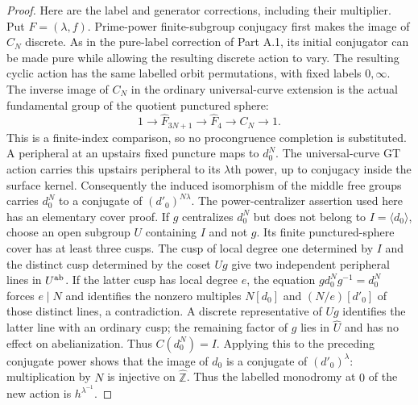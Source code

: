 \begin{proof}
Here are the label and generator corrections, including their
multiplier.  Put $F=(\lambda,f)$.  Prime-power finite-subgroup
conjugacy first makes the image of $C_N$ discrete.  As in the
pure-label correction of Part A.1, its initial conjugator can be
made pure while allowing the resulting discrete action to vary.
The resulting cyclic action has the same labelled orbit
permutations, with fixed labels $0,\infty$.  The inverse image of
$C_N$ in the ordinary universal-curve extension is the actual
fundamental group of the quotient punctured sphere:
\[
 1\longrightarrow\widehat F_{3N+1}
  \longrightarrow\widehat F_4\longrightarrow C_N\longrightarrow1.
                                                               \tag{B.K3}
\]
This is a finite-index comparison, so no procongruence completion
is substituted.  A peripheral at an upstairs fixed puncture maps
to $d_0^N$.  The universal-curve GT action carries this upstairs
peripheral to its $\lambda$th power, up to conjugacy inside the
surface kernel.  Consequently the induced isomorphism of the
middle free groups carries $d_0^N$ to a conjugate of
$(d'_0)^{N\lambda}$.  The power-centralizer assertion used here has an elementary
cover proof.  If $g$ centralizes $d_0^N$ but does not belong to
$I=\langle d_0\rangle$, choose an open subgroup $U$ containing
$I$ and not $g$.  Its finite punctured-sphere cover has at least
three cusps.  The cusp of local degree one determined by $I$
and the distinct cusp determined by the coset $Ug$ give two
independent peripheral lines in $U^{\rm ab}$.  If the latter
cusp has local degree $e$, the equation
$g d_0^N g^{-1}=d_0^N$ forces $e\mid N$ and identifies the
nonzero multiples $N[d_0]$ and $(N/e)[d'_0]$ of those distinct
lines, a contradiction.  A discrete representative of $Ug$
identifies the latter line with an ordinary cusp; the remaining
factor of $g$ lies in $\widehat U$ and has no effect on
abelianization.  Thus $C(d_0^N)=I$.  Applying this to the
preceding conjugate power shows that the image of $d_0$ is a
conjugate of $(d'_0)^\lambda$: multiplication by $N$ is injective
on $\widehat{\mathbb Z}$.  Thus the labelled monodromy at $0$ of
the new action is $h^{\lambda^{-1}}$.


\end{proof}
